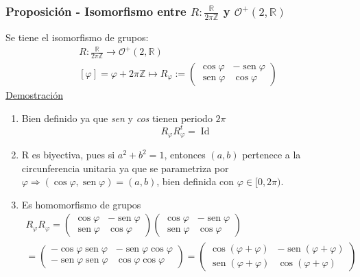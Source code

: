 \documentclass[12pt, a4paper, ones, notitlepage, openany,titlepage]{article}
\newcommand{\demostracion}{\noindent\underline{Demostración}}
\begin{document}
\subsubsection{Proposición - Isomorfismo entre $\displaystyle R: \frac{\mathbb{R}}{2 \pi \mathbb{Z}}$ y $\mathcal{O}^{+}(2, \mathbb{R})$}
\noindent Se tiene el isomorfismo de grupos:
$$
\begin{gathered}
	R: \frac{\mathbb{R}}{2 \pi \mathbb{Z}} \longrightarrow \mathcal{O}^{+}(2, \mathbb{R}) \\
	[\varphi] = \varphi+2 \pi \mathbb{Z} \longmapsto R_{\varphi} := \begin{pmatrix}
		\operatorname{cos}\varphi & -\operatorname{sen}\varphi \\
		\operatorname{sen}\varphi & \operatorname{cos}\varphi
	\end{pmatrix}
\end{gathered}
$$
\demostracion
\begin{enumerate}[label=(\arabic*)]
	\item Bien definido ya que \textit{sen} y \textit{cos} tienen periodo $2\pi$
	$$
	R_\varphi R_\varphi^t = \operatorname{Id}
	$$
	\item R es biyectiva, pues si $a^2 + b^2 = 1$, entonces $(a,b)$ pertenece a la circunferencia unitaria ya que se parametriza por $\varphi \Longrightarrow (\operatorname{cos}\varphi, \operatorname{sen}\varphi) = (a,b)$, bien definida con $\varphi \in [0,2\pi)$.
	\item Es homomorfismo de grupos
	\begin{gather*}
		R_\varphi R_\varphi =
		\begin{pmatrix}
			\operatorname{cos}\varphi & -\operatorname{sen}\varphi \\
			\operatorname{sen}\varphi & \operatorname{cos}\varphi
		\end{pmatrix}
		\begin{pmatrix}
			\operatorname{cos}\varphi & -\operatorname{sen}\varphi \\
			\operatorname{sen}\varphi & \operatorname{cos}\varphi
		\end{pmatrix} \\ =
		\begin{pmatrix}
			-\operatorname{cos}\varphi\operatorname{sen}\varphi & -\operatorname{sen}\varphi\operatorname{cos}\varphi \\
			-\operatorname{sen}\varphi\operatorname{sen}\varphi & \operatorname{cos}\varphi\operatorname{cos}\varphi
		\end{pmatrix} = 
		\begin{pmatrix}
			\operatorname{cos}(\varphi + \varphi) & -\operatorname{sen}(\varphi + \varphi) \\
			\operatorname{sen}(\varphi + \varphi) & \operatorname{cos}(\varphi + \varphi)
		\end{pmatrix}
	\end{gather*}
\end{enumerate}
\end{document}
